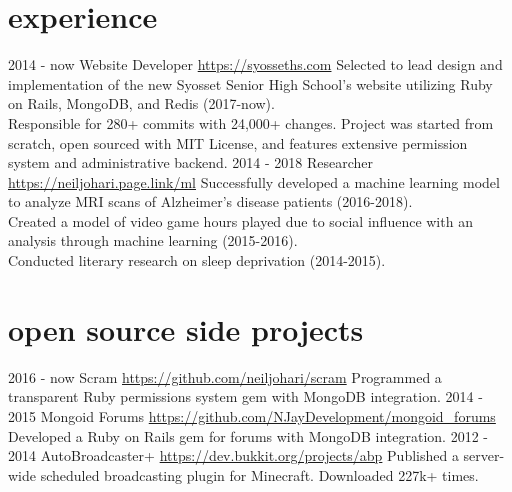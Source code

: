 \documentclass[]{friggeri-cv}
\begin{document}
\section{experience}
    \begin{entrylist}
        \entry
            {2014 - now}
            {Website Developer}
            {\href{https://syosseths.com}{https://syosseths.com}}
            {Selected to lead design and implementation of the new Syosset Senior High School’s website utilizing Ruby on Rails, MongoDB, and Redis (2017-now). \\ 
            Responsible for 280+ commits with 24,000+ changes. Project was started from scratch, open sourced with MIT License, and features extensive permission system and administrative backend.}
        \entry
            {2014 - 2018}
            {Researcher}
            {\href{https://neiljohari.page.link/ml}{https://neiljohari.page.link/ml}}
            {Successfully developed a machine learning model to analyze MRI scans of Alzheimer’s disease patients (2016-2018). \\
            Created a model of video game hours played due to social influence with an analysis through machine learning (2015-2016). \\
            Conducted literary research on sleep deprivation (2014-2015).}
    \end{entrylist} 
    
\section{open source side projects }
    \begin{entrylist}
        \entry
            {2016 - now}
            {Scram}
            {\href{https://github.com/neiljohari/scram}{https://github.com/neiljohari/scram}}
            {Programmed a transparent Ruby permissions system gem with MongoDB integration.}
        \entry
            {2014 - 2015}
            {Mongoid Forums}
            {\href{https://github.com/NJayDevelopment/mongoid_forums}{https://github.com/NJayDevelopment/mongoid\_forums}}
            {Developed a Ruby on Rails gem for forums with MongoDB integration.}
        \entry
            {2012 - 2014}
            {AutoBroadcaster+}
            {\href{https://dev.bukkit.org/projects/abp}{https://dev.bukkit.org/projects/abp}}
            {Published a server-wide scheduled broadcasting plugin for Minecraft. Downloaded 227k+ times.}

    \end{entrylist}
\end{document}
